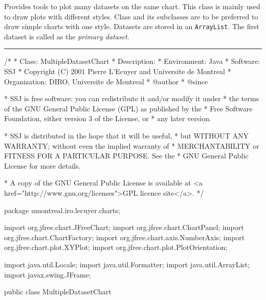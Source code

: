 
Provides tools to plot many datasets on the same chart.
This class is mainly used to draw plots with different styles.
Class  and
its subclasses are to be preferred to draw simple charts with one style.
Datasets are stored in an \texttt{ArrayList}. The first dataset is called
as the \textit{primary dataset}.

\bigskip\hrule
\begin{code}
\begin{hide}
/*
 * Class:        MultipleDatasetChart
 * Description:  
 * Environment:  Java
 * Software:     SSJ 
 * Copyright (C) 2001  Pierre L'Ecuyer and Universite de Montreal
 * Organization: DIRO, Universite de Montreal
 * @author       
 * @since

 * SSJ is free software: you can redistribute it and/or modify it under
 * the terms of the GNU General Public License (GPL) as published by the
 * Free Software Foundation, either version 3 of the License, or
 * any later version.

 * SSJ is distributed in the hope that it will be useful,
 * but WITHOUT ANY WARRANTY; without even the implied warranty of
 * MERCHANTABILITY or FITNESS FOR A PARTICULAR PURPOSE.  See the
 * GNU General Public License for more details.

 * A copy of the GNU General Public License is available at
   <a href="http://www.gnu.org/licenses">GPL licence site</a>.
 */
\end{hide}
package umontreal.iro.lecuyer.charts;\begin{hide}

import   org.jfree.chart.JFreeChart;
import   org.jfree.chart.ChartPanel;
import   org.jfree.chart.ChartFactory;
import   org.jfree.chart.axis.NumberAxis;
import   org.jfree.chart.plot.XYPlot;
import   org.jfree.chart.plot.PlotOrientation;

import   java.util.Locale;
import   java.util.Formatter;
import   java.util.ArrayList;
import   javax.swing.JFrame;\end{hide}

public class MultipleDatasetChart \begin{hide} {

   protected ArrayList<SSJXYSeriesCollection> datasetList;
   protected Axis XAxis;
   protected Axis YAxis;
   protected JFreeChart chart;
   protected boolean latexDocFlag = true;

   protected boolean autoRange = true;
   protected double[] manualRange;

   protected boolean grid = false;
   protected double xstepGrid;
   protected double ystepGrid;

\end{hide}
\end{code}

